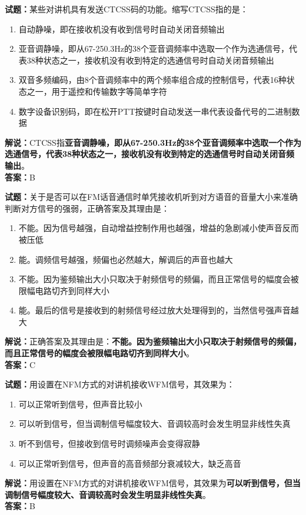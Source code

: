 \documentclass{ctexbook}
\begin{document}
\bigskip


\noindent\textbf{试题：}某些对讲机具有发送CTCSS码的功能。缩写CTCSS指的是：
\begin{enumerate}[leftmargin=3em]
\item 自动静噪，即在接收机没有收到信号时自动关闭音频输出
\item 亚音调静噪，即从67-250.3Hz的38个亚音调频率中选取一个作为选通信号，代表38种状态之一，接收机没有收到特定的选通信号时自动关闭音频输出
\item 双音多频编码，由8个音调频率中的两个频率组合成的控制信号，代表16种状态之一，用于遥控和传输数字等简单字符
\item 数字设备识别码，即在松开PTT按键时自动发送一串代表设备代号的二进制数据
\end{enumerate}
\noindent\textbf{解说：}CTCSS指\textbf{亚音调静噪，即从67-250.3Hz的38个亚音调频率中选取一个作为选通信号，代表38种状态之一，接收机没有收到特定的选通信号时自动关闭音频输出}。\\\noindent\textbf{答案：}B



\bigskip


\noindent\textbf{试题：}关于是否可以在FM话音通信时单凭接收机听到对方语音的音量大小来准确判断对方信号的强弱，正确答案及其理由是：
\begin{enumerate}[leftmargin=3em]
\item 不能。因为信号越强，自动增益控制作用也越强，增益的急剧减小使声音反而被压低
\item 能。调频信号越强，频偏也必然越大，解调后的声音也越大
\item 不能。因为鉴频输出大小只取决于射频信号的频偏，而且正常信号的幅度会被限幅电路切齐到同样大小
\item 能。最后的信号是接收到的射频信号经过放大处理得到的，当然信号强声音越大
\end{enumerate}
\noindent\textbf{解说：}正确答案及其理由是：\textbf{不能。因为鉴频输出大小只取决于射频信号的频偏，而且正常信号的幅度会被限幅电路切齐到同样大小}。\\\noindent\textbf{答案：}C


\bigskip


\noindent\textbf{试题：}用设置在NFM方式的对讲机接收WFM信号，其效果为：
\begin{enumerate}[leftmargin=3em]
\item 可以正常听到信号，但声音比较小
\item 可以听到信号，但当调制信号幅度较大、音调较高时会发生明显非线性失真
\item 听不到信号，但接收到信号时调频噪声会变得寂静
\item 可以正常听到信号，但声音的高音频部分衰减较大，缺乏高音
\end{enumerate}
\noindent\textbf{解说：}用设置在NFM方式的对讲机接收WFM信号，其效果为\textbf{可以听到信号，但当调制信号幅度较大、音调较高时会发生明显非线性失真}。\\\noindent\textbf{答案：}B
\end{document}
